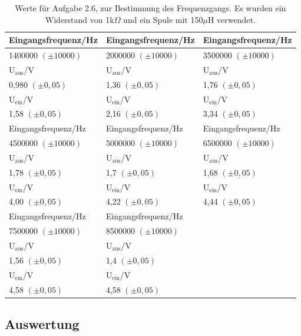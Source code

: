 \documentclass[12pt]{scrartcl}
\begin{document}
\begin{table}[H]
\caption{Werte für Aufgabe 2.6, zur Bestimmung des Frequenzgangs. Es wurden ein Widerstand von 1k$\Omega$ und ein Spule mit 150$\mu$H verwendet.}
\begin{center}
\begin{tabular}{|l|l|l|}
\hline
Eingangsfrequenz/Hz & Eingangsfrequenz/Hz & Eingangsfrequenz/Hz \\ \hline
1400000 $(\pm 10000)$ & 2000000 $(\pm 10000)$ & 3500000 $(\pm 10000)$ \\ \hline
U$_\text{aus}$/V & U$_\text{aus}$/V & U$_\text{aus}$/V \\ \hline
0,980 $(\pm 0,05)$ & 1,36  $(\pm 0,05)$ & 1,76 $(\pm 0,05)$ \\ \hline
U$_\text{ein}$/V & U$_\text{ein}$/V & U$_\text{ein}$/V \\ \hline
1,58 $(\pm 0,05)$ & 2,16 $(\pm 0,05)$ & 3,34 $(\pm 0,05)$ \\ \hline \hline
Eingangsfrequenz/Hz & Eingangsfrequenz/Hz & Eingangsfrequenz/Hz \\ \hline
4500000 $(\pm 10000)$ & 5000000 $(\pm 10000)$ & 6500000 $(\pm 10000)$ \\ \hline
U$_\text{aus}$/V & U$_\text{aus}$/V & U$_\text{aus}$/V \\ \hline
1,78 $(\pm 0,05)$ & 1,7 $(\pm 0,05)$ & 1,68 $(\pm 0,05)$ \\ \hline
U$_\text{ein}$/V & U$_\text{ein}$/V & U$_\text{ein}$/V \\ \hline
4,00  $(\pm 0,05)$ & 4,22 $(\pm 0,05)$ & 4,44 $(\pm 0,05)$ \\ \hline \hline
Eingangsfrequenz/Hz & Eingangsfrequenz/Hz &  \\ \hline
7500000 $(\pm 10000)$ & 8500000 $(\pm 10000)$ &  \\ \hline
U$_\text{aus}$/V & U$_\text{aus}$/V &  \\ \hline
1,56 $(\pm 0,05)$ & 1,4 $(\pm 0,05)$ &  \\ \hline
U$_\text{ein}$/V & U$_\text{ein}$/V &  \\ \hline
4,58 $(\pm 0,05)$ & 4,58 $(\pm 0,05)$ &  \\ \hline
\end{tabular}
\end{center}
\label{tab:2.6}
\end{table}

\subsection{Auswertung}
\end{document}
